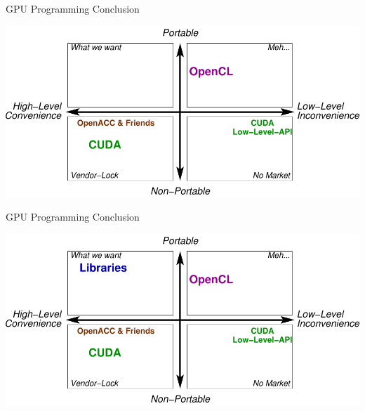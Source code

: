

\begin{frame}[fragile]{GPU Programming Conclusion}
 \begin{center}
  \includegraphics[width=\textwidth]{figures/gpu-programming-comparison-final}
 \end{center}
\end{frame}

\begin{frame}[fragile]{GPU Programming Conclusion}
 \begin{center}
  \includegraphics[width=\textwidth]{figures/gpu-programming-comparison-final-libraries}
 \end{center}
\end{frame}
